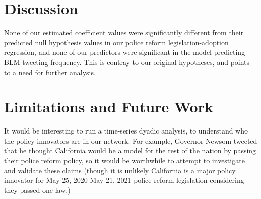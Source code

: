 \documentclass[12pt]{article}
\begin{document}
\hypertarget{discussion}{%
\section{Discussion}\label{discussion}}

None of our estimated coefficient values were significantly different
from their predicted null hypothesis values in our police reform
legislation-adoption regression, and none of our predictors were
significant in the model predicting BLM tweeting frequency. This is
contray to our original hypotheses, and points to a need for further
analysis.

\hypertarget{limitations-and-future-work}{%
\section{Limitations and Future
Work}\label{limitations-and-future-work}}

It would be interesting to run a time-series dyadic analysis, to
understand who the policy innovators are in our network. For example,
Governor Newsom tweeted that he thought California would be a model for
the rest of the nation by passing their police reform policy, so it
would be worthwhile to attempt to investigate and validate these claims
(though it is unlikely California is a major policy innovator for May
25, 2020-May 21, 2021 police reform legislation considering they passed
one law.)



\end{document}

